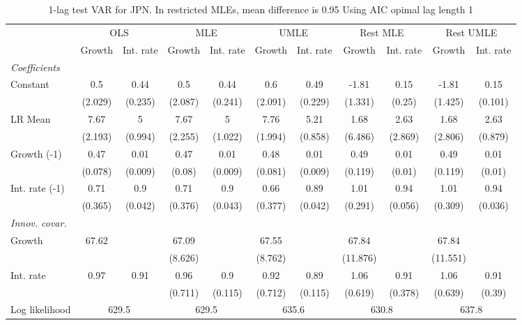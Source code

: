 \begin{table}[htbp] 
	\centering
	\begin{tabular}{@{\extracolsep{4pt}}lcccccccccc@{}}		\hline\hline
		 		 & \multicolumn{2}{c}{OLS} &\multicolumn{2}{c}{MLE} &\multicolumn{2}{c}{UMLE} &\multicolumn{2}{c}{Rest MLE} &\multicolumn{2}{c}{Rest UMLE} \\ 
 		 & Growth 	 & Int. rate 	 & Growth 	 & Int. rate 	 & Growth 	 & Int. rate 	 & Growth 	 & Int. rate 	 & Growth 	 & Int. rate\\\cline{2-3}\cline{4-5}\cline{6-7}\cline{8-9}\cline{10-11}
\rule{0pt}{4ex} 
 \emph{Coefficients} 	  		 & 		 & 		 & 		 & 		 & 		 & 		 & 		 & 		 & 		 &\\ 
\quad Constant 	 & 0.5 	 & 0.44 	 & 0.5 	 & 0.44 	 & 0.6 	 & 0.49 	 & -1.81 	 & 0.15 	 & -1.81 	 & 0.15	 \\ 
 		 & (2.029) 	 & (0.235) 	 & (2.087) 	 & (0.241) 	 & (2.091) 	 & (0.229) 	 & (1.331) 	 & (0.25) 	 & (1.425) 	 & (0.101) 	 \\ 
\quad LR Mean 	 & 7.67 	 & 5 	 & 7.67 	 & 5 	 & 7.76 	 & 5.21 	 & 1.68 	 & 2.63 	 & 1.68 	 & 2.63	 \\ 
 		 & (2.193) 	 & (0.994) 	 & (2.255) 	 & (1.022) 	 & (1.994) 	 & (0.858) 	 & (6.486) 	 & (2.869) 	 & (2.806) 	 & (0.879) 	 \\ 
\quad Growth (-1) 	 &0.47 	 & 0.01 	 & 0.47 	 & 0.01 	 & 0.48 	 & 0.01 	 & 0.49 	 & 0.01 	 & 0.49 	 & 0.01	 \\ 
 		 & (0.078) 	 & (0.009) 	 & (0.08) 	 & (0.009) 	 & (0.081) 	 & (0.009) 	 & (0.119) 	 & (0.01) 	 & (0.119) 	 & (0.01) 	 \\ 
\quad Int. rate (-1) 	 &0.71 	 & 0.9 	 & 0.71 	 & 0.9 	 & 0.66 	 & 0.89 	 & 1.01 	 & 0.94 	 & 1.01 	 & 0.94	 \\ 
 		 & (0.365) 	 & (0.042) 	 & (0.376) 	 & (0.043) 	 & (0.377) 	 & (0.042) 	 & (0.291) 	 & (0.056) 	 & (0.309) 	 & (0.036) 	 \\ 
\rule{0pt}{4ex} \emph{Innov. covar.}  	 & 	 & 	 & 	 & 	 & 	 & 	 & 	 & 	 & 	 &\\ 
\quad Growth 	 &67.62 	 &  	 & 67.09 	 &  	 & 67.55 	 &  	 & 67.84 	 &  	 & 67.84 	 & 	 \\ 
 		 &  	 &  	 & (8.626) 	 &  	 & (8.762) 	 &  	 & (11.876) 	 &  	 & (11.551) 	 &  	 \\ 
\quad Int. rate 	 &0.97 	 & 0.91 	 & 0.96 	 & 0.9 	 & 0.92 	 & 0.89 	 & 1.06 	 & 0.91 	 & 1.06 	 & 0.91	 \\ 
 		 &  	 &  	 & (0.711) 	 & (0.115) 	 & (0.712) 	 & (0.115) 	 & (0.619) 	 & (0.378) 	 & (0.639) 	 & (0.39) 	 \\ 
 \hline \rule{0pt}{4ex} 
  Log likelihood 	 &\multicolumn{2}{c}{629.5} 	 & \multicolumn{2}{c}{629.5} 	 & \multicolumn{2}{c}{635.6} 	 & \multicolumn{2}{c}{630.8} 	 & \multicolumn{2}{c}{637.8}\\ 

 \hline 	\end{tabular}		\caption{1-lag test VAR for JPN. In restricted MLEs, mean difference is 0.95 Using AIC opimal lag length 1}
		\label{tab:JPNopt_}

\end{table}